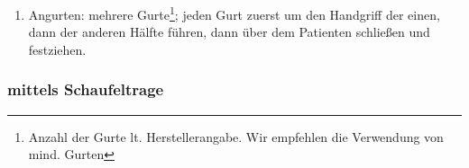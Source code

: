 \begin{ProcedureStepsNoHeading}
{\begin{enumerate}
\begin{itemize}
      Diese Methode ist besonders bei Becken- und
      Oberschenkelverletzungen sinnvoll und der zweiten
      Methode vorzuziehen da der Patient nicht am Becken
      bewegt wird.
      \item 2. Methode: Beide Teile sind getrennt.
      \begin{enumerate}
        \item Der Patient wird leicht an
        Schulter und Hüfte abwechselnd zur Seite gedreht, dabei
        stabilisiert ein 3. Helfer
        den Kopf und folgt der Drehbewegung achsengerecht.
        Die jeweiligen Tragenteile werden während der Drehbewegung
        unter den Patienten geschoben.
        \item Die Hälften werden zuerst am Kopf-, dann am Fußende
        geschlossen.
        \item Abschließend wird eine Kontrolle des sicheren Schlusses durchgeführt.
      \end{enumerate}
    \end{itemize}
    \item Angurten: mehrere Gurte\footnote{Anzahl der Gurte lt.
    Herstellerangabe. Wir empfehlen die Verwendung von mind.  Gurten};
    jeden Gurt zuerst um den Handgriff der einen, dann der anderen Hälfte
    führen,  dann über dem Patienten schließen und festziehen.
\end{enumerate}
}{}{}{}{}
\end{ProcedureStepsNoHeading}

\clearpage
\subsubsection{ mittels Schaufeltrage}
\label{topic:schaufeltrage-umlagern}

